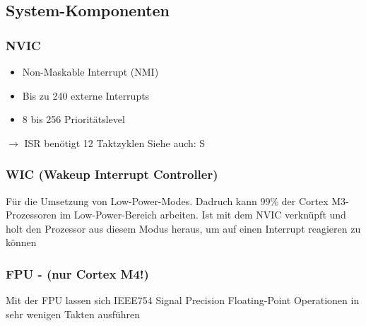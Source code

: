 \subsection{System-Komponenten}
\begin{multicols}{2}
    \begin{minipage}{\linewidth}
        \subsubsection{NVIC}
        \begin{itemize}
            \item Non-Maskable Interrupt (NMI)
            \item Bis zu 240 externe Interrupts
            \item 8 bis 256 Prioritätslevel
        \end{itemize}
        $\rightarrow$ ISR benötigt 12 Taktzyklen\newline
        Siehe auch: S\pageref{NVIC}\\
    \end{minipage}

    \begin{minipage}{\linewidth}
        \subsubsection{WIC (Wakeup Interrupt Controller)}
        Für die Umsetzung von Low-Power-Modes.\newline
        Dadruch kann 99\% der Cortex M3-Prozessoren im Low-Power-Bereich arbeiten.
        \newline
        \newline
        Ist mit dem NVIC verknüpft und holt den Prozessor aus diesem Modus heraus, um auf einen Interrupt reagieren zu können\\
    \end{minipage}
    
    \begin{minipage}{\linewidth}
        \subsubsection{FPU - (nur Cortex M4!)}
        Mit der FPU lassen sich IEEE754 Signal Precision Floating-Point Operationen in sehr wenigen Takten ausführen\\
    \end{minipage}
    
    \begin{minipage}{\linewidth}

\end{minipage}
\end{multicols}
